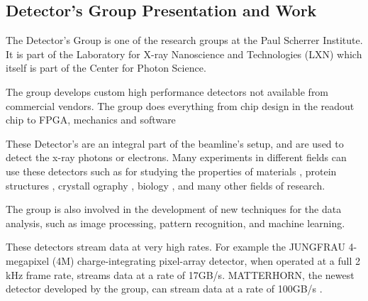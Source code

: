 \begin{spacing}{1.2}
    \section{Detector's Group Presentation and Work}
    The Detector's Group is one of the research groups at the Paul Scherrer Institute. It is part of the Laboratory for X-ray Nanoscience and Technologies (LXN) which itself
    is part of the Center for Photon Science.

    The group develops custom high performance detectors not available from commercial vendors.
    The group does everything from chip design in the readout chip to FPGA,
    mechanics and software

    These Detector's are an integral part of the beamline's setup, and are used to detect the x-ray photons or electrons. Many experiments in different
    fields can use these detectors such as for studying the properties of
    materials \cite{butcher2024ptychographic},
    protein structures \cite{pomeranz2009crystal}, crystall
    ography \cite{leonarski2023kilohertz}, biology \cite{lemcoff2023brilliant,dullin2024vivo}, and many other fields of research.

    The group is also involved in the development of new techniques for the data analysis, such as image processing,
    pattern recognition, and machine learning.

    These detectors stream data at very high rates. For example the JUNGFRAU 4-megapixel (4M)
    charge-integrating pixel-array detector, when operated at a full 2 kHz frame rate,
    streams data at a rate of 17GB/s. MATTERHORN, the newest detector developed by the group,
    can stream data at a rate of 100GB/s \cite{matterhorn, jungfraujoch}.\\


\end{spacing}
